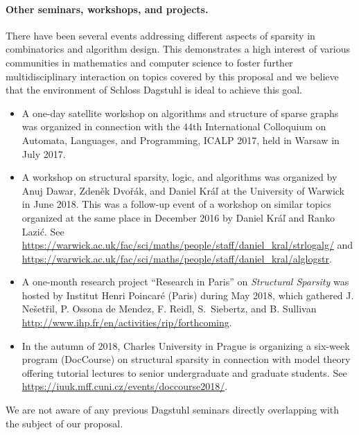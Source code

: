 \paragraph*{Other seminars, workshops, and projects.}
There have been several events addressing different aspects of sparsity in combinatorics and algorithm design.
This demonstrates a high interest of various communities in mathematics and computer science
to foster further multidisciplinary interaction on topics covered by this proposal and
we believe that the environment of Schloss Dagstuhl is ideal to achieve this goal.
\begin{itemize}
\item A one-day satellite workshop on algorithms and structure of sparse graphs was organized in connection with the 44th International Colloquium on Automata, Languages, and Programming, ICALP 2017, held in Warsaw in July 2017.
\item A workshop on structural sparsity, logic, and algorithms was organized by Anuj Dawar, Zden\v ek Dvo\v{r}\'ak, and Daniel Kr\'a\v{l} at the University of Warwick in June 2018. This was a follow-up event of a workshop on similar topics organized at the same place in December 2016 by Daniel Kr\'a\v{l} and Ranko Lazi\'c. See \url{https://warwick.ac.uk/fac/sci/maths/people/staff/daniel_kral/strlogalg/}
and \url{https://warwick.ac.uk/fac/sci/maths/people/staff/daniel_kral/alglogstr}.
\item A one-month research project ``Research in Paris'' on {\em Structural Sparsity} was hosted by Institut Henri Poincar\'e (Paris) during May 2018, which gathered J. Ne\v set\v ril, P. Ossona de Mendez, F. Reidl, S.~Siebertz, and B. Sullivan 
\url{http://www.ihp.fr/en/activities/rip/forthcoming}.
\item In the autumn of 2018, Charles University in Prague is organizing a six-week program (DocCourse) on structural sparsity in connection with model theory offering tutorial lectures to senior undergraduate and graduate students. See \url{https://iuuk.mff.cuni.cz/events/doccourse2018/}.
\end{itemize}
We are not aware of any previous Dagstuhl seminars directly overlapping with the subject of our proposal.
